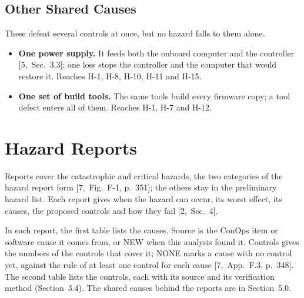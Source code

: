 \documentclass[11pt,a4paper]{article}
\begin{document}
\subsection{Other Shared Causes}
These defeat several controls at once, but no hazard falls to them alone.
\begin{itemize}
\item \textbf{One power supply.} It feeds both the onboard computer and the
  controller [5,~Sec.~3.3]; one loss stops the controller and the computer that
  would restore it. Reaches H-1, H-8, H-10, H-11 and H-15.
\item \textbf{One set of build tools.} The same tools build every firmware
  copy; a tool defect enters all of them. Reaches H-1, H-7 and H-12.
\end{itemize}

\section{Hazard Reports}
Reports cover the catastrophic and critical hazards, the two categories of
the hazard report form [7,~Fig.~F-1, p.~351]; the others stay in the
preliminary hazard list. Each report gives when the hazard can occur, its
worst effect, its causes, the proposed controls and how they fail
[2,~Sec.~4].

In each report, the first table lists the causes. Source is the ConOps item or
software cause it comes from, or NEW when this analysis found it. Controls
gives the numbers of the controls that cover it; NONE marks a cause with no
control yet, against the rule of at least one control for each cause
[7,~App.~F.3, p.~348]. The second table lists the controls, each with its
source and its verification method (Section~3.4). The shared causes behind the
reports are in Section~5.0.
\end{document}

